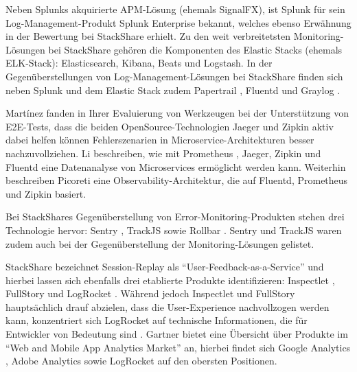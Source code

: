 Neben Splunks akquirierte APM-Lösung (ehemals SignalFX), ist Splunk für sein Log-Management-Produkt Splunk Enterprise \cite{SplunkEnterprise} bekannt, welches ebenso Erwähnung in der Bewertung bei StackShare erhielt. Zu den weit verbreitetsten Monitoring-Lösungen bei StackShare \cite{StackShareMonitoring} gehören die Komponenten des Elastic Stacks \cite{ElasticStack} (ehemals ELK-Stack): Elasticsearch, Kibana, Beats und Logstash. In der Gegenüberstellungen von Log-Management-Lösungen bei StackShare \cite{StackShareLogManagement} finden sich neben Splunk und dem Elastic Stack zudem Papertrail \cite{Papertrail}, Fluentd \cite{Fluentd} und Graylog \cite{Graylog}.

Mart{\'i}nez \etal \cite{ComparisonOfE2ETestingToolsForMicroservices} fanden in Ihrer Evaluierung von Werkzeugen bei der Unterstützung von E2E-Tests, dass die beiden OpenSource-Technologien Jaeger \cite{Jaeger} und Zipkin \cite{Zipkin} aktiv dabei helfen können Fehlerszenarien in Microservice-Architekturen besser nachzuvollziehen. Li \etal \cite{ServiceMeshChallengesStateOfTheArt} beschreiben, wie mit Prometheus \cite{Prometheus}, Jaeger, Zipkin und Fluentd \cite{Fluentd} eine Datenanalyse von Microservices ermöglicht werden kann. Weiterhin beschreiben Picoreti \etal \cite{MultilevelObservabilityInCloudOrchestration} eine Observability-Architektur, die auf Fluentd, Prometheus und Zipkin basiert.

Bei StackShares Gegenüberstellung von Error-Monitoring-Produkten \cite{StackShareExceptionMonitoring} stehen drei Technologie hervor: Sentry \cite{Sentry}, TrackJS \cite{TrackJS} sowie Rollbar \cite{Rollbar}. Sentry und TrackJS waren zudem auch bei der Gegenüberstellung der Monitoring-Lösungen \cite{StackShareMonitoring} gelistet.

StackShare bezeichnet Session-Replay als \enquote{User-Feedback-as-a-Service} und hierbei \cite{StackShareUserFeedbackAsAService} lassen sich ebenfalls drei etablierte Produkte identifizieren: Inspectlet \cite{Inspectlet}, FullStory \cite{FullStory} und LogRocket \cite{LogRocket}. Während jedoch Inspectlet und FullStory hauptsächlich drauf abzielen, dass die User-Experience nachvollzogen werden kann, konzentriert sich LogRocket auf technische Informationen, die für Entwickler von Bedeutung sind \cite{Webalyt}. Gartner bietet eine Übersicht \cite{GartnerWebAndMobileAppAnalytics} über Produkte im \enquote{Web and Mobile App Analytics Market} an, hierbei findet sich Google Analytics \cite{GoogleAnalytics}, Adobe Analytics \cite{AdobeAnalytics} sowie LogRocket auf den obersten Positionen.

